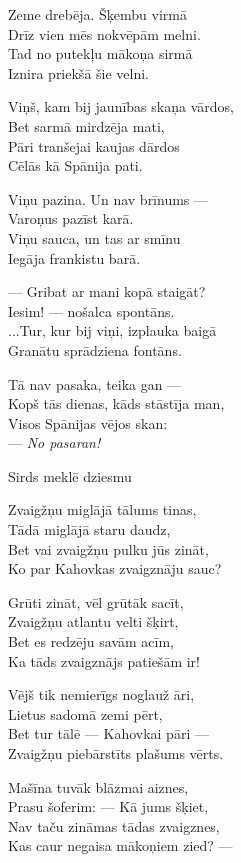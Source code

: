 \documentclass[14pt]{extarticle}
\begin{document}
{Zeme drebēja. Šķembu virmā\\
Drīz vien mēs nokvēpām melni.\\
Tad no putekļu mākoņa sirmā\\
Iznira priekšā šie velni.

Viņš, kam bij jaunības skaņa vārdos,\\
Bet sarmā mirdzēja mati,\\
Pāri tranšejai kaujas dārdos\\
Cēlās kā Spānija pati.

Viņu pazina. Un nav brīnums ---\\
Varoņus pazīst karā.\\
Viņu sauca, un tas ar smīnu\\
Iegāja frankistu barā.

--- Gribat ar mani kopā staigāt?\\
Iesim! --- nošalca spontāns.\\
...Tur, kur bij viņi, izplauka baigā\\
Granātu sprādziena fontāns.

Tā nav pasaka, teika gan ---\\
Kopš tās dienas, kāds stāstīja man,\\
Visos Spānijas vējos skan:\\
--- {\em No pasaran!}

\newpage

{\large \sc Sirds meklē dziesmu}

Zvaigžņu miglājā tālums tinas,\\
Tādā miglājā staru daudz,\\
Bet vai zvaigžņu pulku jūs zināt,\\
Ko par Kahovkas zvaigznāju sauc?

Grūti zināt, vēl grūtāk sacīt,\\
Zvaigžņu atlantu velti šķirt,\\
Bet es redzēju savām acīm,\\
Ka tāds zvaigznājs patiešām ir!

Vējš tik nemierīgs noglauž āri,\\
Lietus sadomā zemi pērt,\\
Bet tur tālē --- Kahovkai pāri ---\\
Zvaigžņu piebārstīts plašums vērts.

Mašīna tuvāk blāzmai aiznes,\\
Prasu šoferim: --- Kā jums šķiet, \\
Nav taču zināmas tādas zvaigznes,\\
Kas caur negaisa mākoņiem zied? ---

}
\end{document}
